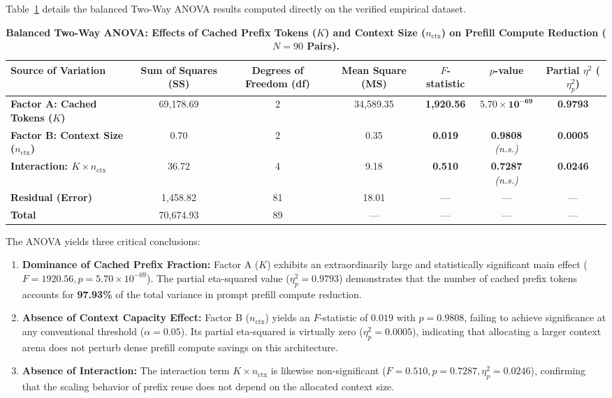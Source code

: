 Table~\ref{tab:anova} details the balanced Two-Way ANOVA results computed directly on the verified empirical dataset.

\begin{table}[t]
\centering
\caption{\textbf{Balanced Two-Way ANOVA: Effects of Cached Prefix Tokens ($K$) and Context Size ($n_{\text{ctx}}$) on Prefill Compute Reduction ($N=90$ Pairs).}}
\label{tab:anova}
\small
\begin{tabular}{lcccccc}
\toprule
\textbf{Source of Variation} & \textbf{Sum of Squares (SS)} & \textbf{Degrees of Freedom (df)} & \textbf{Mean Square (MS)} & \textbf{$F$-statistic} & \textbf{$p$-value} & \textbf{Partial $\eta^2$ ($\eta_p^2$)} \\
\midrule
\textbf{Factor A: Cached Tokens ($K$)} & 69,178.69 & 2 & 34,589.35 & \textbf{1,920.56} & $\mathbf{5.70 \times 10^{-69}}$ & \textbf{0.9793} \\
\textbf{Factor B: Context Size ($n_{\text{ctx}}$)} & 0.70 & 2 & 0.35 & \textbf{0.019} & \textbf{0.9808} \textit{(n.s.)} & \textbf{0.0005} \\
\textbf{Interaction: $K \times n_{\text{ctx}}$} & 36.72 & 4 & 9.18 & \textbf{0.510} & \textbf{0.7287} \textit{(n.s.)} & \textbf{0.0246} \\
\midrule
\textbf{Residual (Error)} & 1,458.82 & 81 & 18.01 & — & — & — \\
\textbf{Total} & 70,674.93 & 89 & — & — & — & — \\
\bottomrule
\end{tabular}
\end{table}

The ANOVA yields three critical conclusions:
\begin{enumerate}
    \item \textbf{Dominance of Cached Prefix Fraction:} Factor A ($K$) exhibits an extraordinarily large and statistically significant main effect ($F = 1920.56, p = 5.70 \times 10^{-69}$). The partial eta-squared value ($\eta_p^2 = 0.9793$) demonstrates that the number of cached prefix tokens accounts for \textbf{97.93\%} of the total variance in prompt prefill compute reduction.
    \item \textbf{Absence of Context Capacity Effect:} Factor B ($n_{\text{ctx}}$) yields an $F$-statistic of $0.019$ with $p = 0.9808$, failing to achieve significance at any conventional threshold ($\alpha = 0.05$). Its partial eta-squared is virtually zero ($\eta_p^2 = 0.0005$), indicating that allocating a larger context arena does not perturb dense prefill compute savings on this architecture.
    \item \textbf{Absence of Interaction:} The interaction term $K \times n_{\text{ctx}}$ is likewise non-significant ($F = 0.510, p = 0.7287, \eta_p^2 = 0.0246$), confirming that the scaling behavior of prefix reuse does not depend on the allocated context size.
\end{enumerate}

